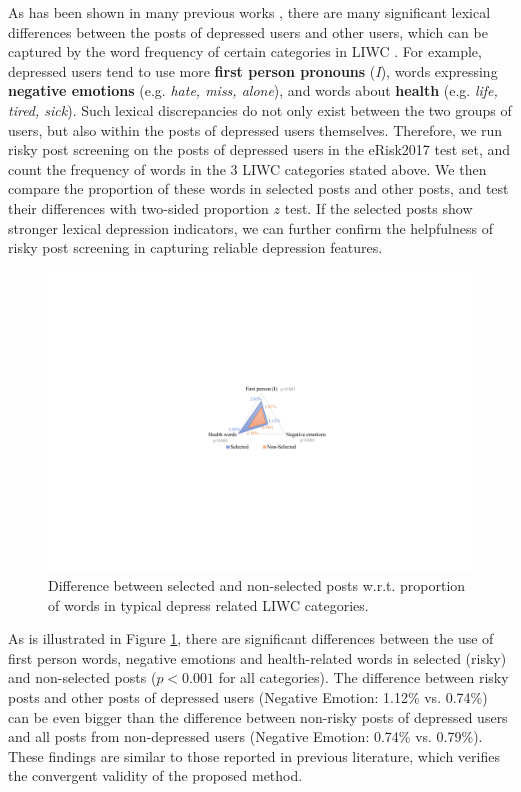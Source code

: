 \documentclass{article}
\begin{document}
As has been shown in many previous works \cite{shen2017depression,eichstaedt2018facebook,wolohan2018detecting}, there are many significant lexical differences between the posts of depressed users and other users, which can be captured by the word frequency of certain categories in LIWC \cite{pennebaker2001linguistic}. For example, depressed users tend to use more \textbf{first person pronouns} (\textit{I}), words expressing \textbf{negative emotions} (e.g. \textit{hate, miss, alone}), and words about \textbf{health} (e.g. \textit{life, tired, sick}). Such lexical discrepancies do not only exist between the two groups of users, but also within the posts of depressed users themselves. Therefore, we run risky post screening on the posts of depressed users in the eRisk2017 test set, and count the frequency of words in the 3 LIWC categories stated above. We then compare the proportion of these words in selected posts and other posts, and test their differences with two-sided proportion $z$ test. If the selected posts show stronger lexical depression indicators, we can further confirm the helpfulness of risky post screening in capturing reliable depression features.

\begin{figure}[h]
  \centering
  \includegraphics[width=0.88\columnwidth]{figures/lexical.pdf}
  \caption{Difference between selected and non-selected posts w.r.t. proportion of words in typical depress related LIWC categories.}
  \label{fig:lexical}
\end{figure}

As is illustrated in Figure \ref{fig:lexical}, there are significant differences between the use of first person words, negative emotions and health-related words in selected (risky) and non-selected posts ($p < 0.001$ for all categories). The difference between risky posts and other posts of depressed users (Negative Emotion: 1.12\% vs. 0.74\%) can be even bigger than the difference between non-risky posts of depressed users and all posts from non-depressed users (Negative Emotion: 0.74\% vs. 0.79\%). These findings are similar to those reported in previous literature, which verifies the convergent validity of the proposed method.
\end{document}
